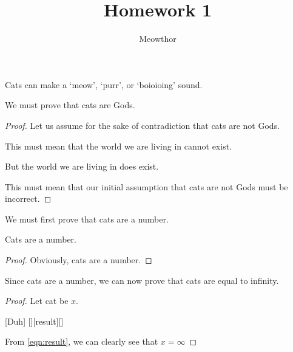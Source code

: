 \documentclass{assignmeownt}
\title{Homework 1}
\author{Meowthor}
\date{}
\begin{document}
\maketitle
\thispagestyle{firststyle}

\question
{}
\par Cats can make a `meow', `purr', or `boioioing' sound.

\bigskip


We must prove that cats are Gods.

\begin{proof}
  \par Let us assume for the sake of contradiction that cats are not Gods.
  \par This must mean that the world we are living in cannot exist.
  \par But the world we are living in does exist.
  \par This must mean that our initial assumption that cats are not Gods must be incorrect.
\end{proof}

\par {}

\par We must first prove that cats are a number.
\begin{lemma}
  Cats are a number.
\end{lemma}
\begin{proof}
  \par Obviously, cats are a number.
\end{proof}

\par Since cats are a number, we can now prove that cats are equal to infinity.
\begin{proof}
  Let cat be \( x \).
  \begin{meowquation}
    [Duh]
    [][result][]
  \end{meowquation}
  
  \par From \eqref{eqn:result}, we can clearly see that \( x = \infty \)
\end{proof}

\par {}
\end{document}
